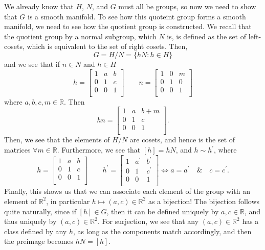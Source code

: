 \documentclass[10pt]{article}
\newcommand{\R}{\mathbb{R}}
\begin{document}
We already know that $H$, $N$, and $G$ must all be groups, so now we need to show that $G$ is a smooth manifold. To see how this quoteint group forms a smooth manifold, we need to see how the quotient group is constructed. We recall that the quotient group by a normal subgroup, which $N$ is, is defined as the set of left-cosets, which is equivalent to the set of right cosets. Then,
\[ G = H/N = \{hN: h\in H\} \]
and we see that if $n\in N$ and $h\in H$
\[ h =
\begin{bmatrix}
  1 & a & b \\
  0 & 1 & c \\
  0 & 0 & 1 \\
\end{bmatrix}
\hspace{2em}
n =
\begin{bmatrix}
  1 & 0 & m \\
  0 & 1 & 0 \\
  0 & 0 & 1 \\
\end{bmatrix}
\]
where $a,b,c,m \in \R$. Then
\[ hn =
\begin{bmatrix}
  1 & a & b+m \\
  0 & 1 & c \\
  0 & 0 & 1 \\
\end{bmatrix}
.\]
Then, we see that the elements of $H/N$ are cosets, and hence is the set of matrices $\forall m \in \R$. Furthermore, we see that $[h] = hN$, and $h \sim h^{\prime}$, where
\[ h =
\begin{bmatrix}
  1 & a & b \\
  0 & 1 & c \\
  0 & 0 & 1 \\
\end{bmatrix}
\hspace{2em}
h^{\prime} =
\begin{bmatrix}
  1 & a^{\prime} & b^{\prime} \\
  0 & 1 & c^{\prime} \\
  0 & 0 & 1 \\
\end{bmatrix}
\iff a = a^{\prime} \hspace{1em} \& \hspace{1em} c = c^{\prime}.
\]
Finally, this shows us that we can associate each element of the group with an element of $\R^{2}$, in particular $h\mapsto (a,c)\in \R^{2}$ as a bijection! The bijection follows quite naturally, since if $[h]\in G$, then it can be defined uniquely by $a,c \in \R$, and thus uniquely by $(a,c)\in \R^{2}$. For surjection, we see that any $(a,c)\in \R^{2}$ has a class defined by any $h$, as long as the components match accordingly, and then the preimage becomes $hN = [h]$.
\end{document}
